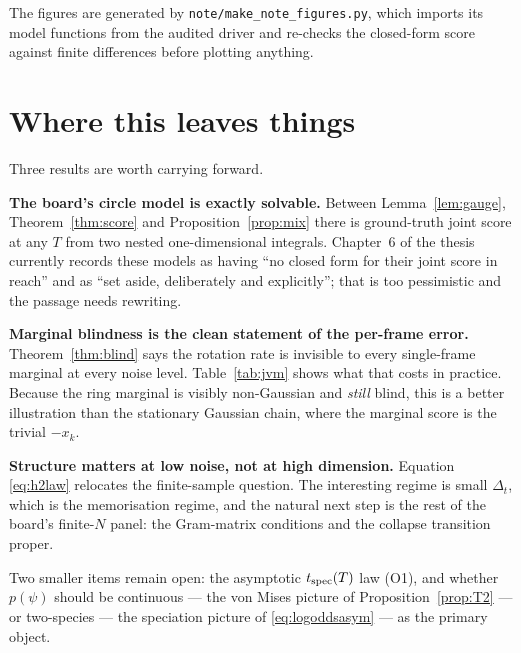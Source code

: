 \documentclass[11pt]{article}
\theoremstyle{plain}
\theoremstyle{remark}
\begin{document}
The figures are generated by \texttt{note/make\_note\_figures.py}, which imports
its model functions from the audited driver and re-checks the closed-form score
against finite differences before plotting anything.

\section{Where this leaves things}\label{sec:next}

Three results are worth carrying forward.

\textbf{The board's circle model is exactly solvable.} Between
Lemma~\ref{lem:gauge}, Theorem~\ref{thm:score} and Proposition~\ref{prop:mix}
there is ground-truth joint score at any $T$ from two nested one-dimensional
integrals. Chapter~6 of the thesis currently records these models as having ``no
closed form for their joint score in reach'' and as ``set aside, deliberately
and explicitly''; that is too pessimistic and the passage needs rewriting.

\textbf{Marginal blindness is the clean statement of the per-frame error.}
Theorem~\ref{thm:blind} says the rotation rate is invisible to every single-frame
marginal at every noise level. Table~\ref{tab:jvm} shows what that costs in
practice. Because the ring marginal is visibly non-Gaussian and \emph{still}
blind, this is a better illustration than the stationary Gaussian chain, where
the marginal score is the trivial $-x_k$.

\textbf{Structure matters at low noise, not at high dimension.} Equation
\eqref{eq:h2law} relocates the finite-sample question. The interesting regime is
small $\Delta_t$, which is the memorisation regime, and the natural next step is
the rest of the board's finite-$N$ panel: the Gram-matrix conditions and the
collapse transition proper.

Two smaller items remain open: the asymptotic $t_{\rm spec}(T)$ law (O1), and
whether $p(\psi)$ should be continuous --- the von Mises picture of
Proposition~\ref{prop:T2} --- or two-species --- the speciation picture of
\eqref{eq:logoddsasym} --- as the primary object.
\end{document}
